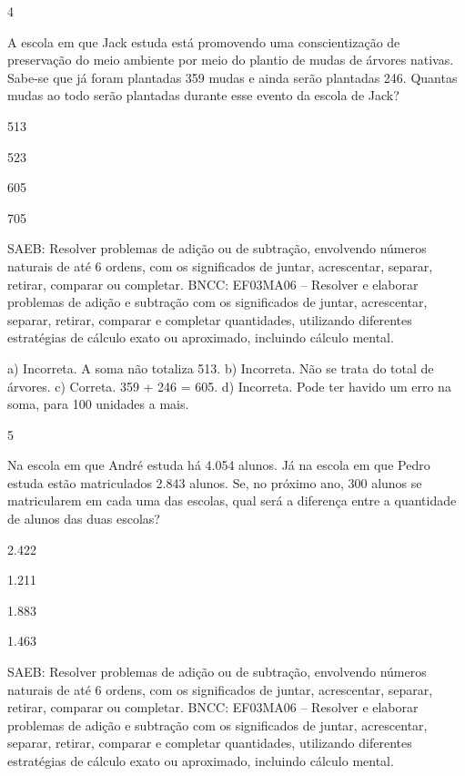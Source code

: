 {\begin{escolha}
{\num{4}

A escola em que Jack estuda está promovendo uma conscientização de
preservação do meio ambiente por meio do plantio de mudas de árvores
nativas. Sabe-se que já foram plantadas 359 mudas e ainda serão
plantadas 246. Quantas mudas ao todo serão plantadas durante esse evento
da escola de Jack?

\begin{escolha}
\item
  513
\item
  523
\item
  605
\item
  705
\end{escolha}

SAEB: Resolver problemas de adição ou de subtração,
envolvendo números naturais de até 6 ordens, com os significados de
juntar, acrescentar, separar, retirar, comparar ou completar.
BNCC: EF03MA06 – Resolver e elaborar problemas de adição e subtração com os significados de
juntar, acrescentar, separar, retirar, comparar e completar quantidades, utilizando diferentes
estratégias de cálculo exato ou aproximado, incluindo cálculo mental.

a) Incorreta. A soma não totaliza 513.
b) Incorreta. Não se trata do total de árvores.
c) Correta. 359 + 246 = 605.
d) Incorreta. Pode ter havido um erro na soma, para 100 unidades a mais.

\num{5}

Na escola em que André estuda há 4.054 alunos. Já na escola em que
Pedro estuda estão matriculados 2.843 alunos. Se, no próximo ano, 300
alunos se matricularem em cada uma das escolas, qual será a diferença
entre a quantidade de alunos das duas escolas?

\begin{escolha}
\item
  2.422
\item
  1.211
\item
  1.883
\item
  1.463
\end{escolha}


SAEB: Resolver problemas de adição ou de subtração,
envolvendo números naturais de até 6 ordens, com os significados de
juntar, acrescentar, separar, retirar, comparar ou completar.
BNCC: EF03MA06 – Resolver e elaborar problemas de adição e subtração com os significados de
juntar, acrescentar, separar, retirar, comparar e completar quantidades, utilizando diferentes
estratégias de cálculo exato ou aproximado, incluindo cálculo mental.

}
\end{escolha}}
